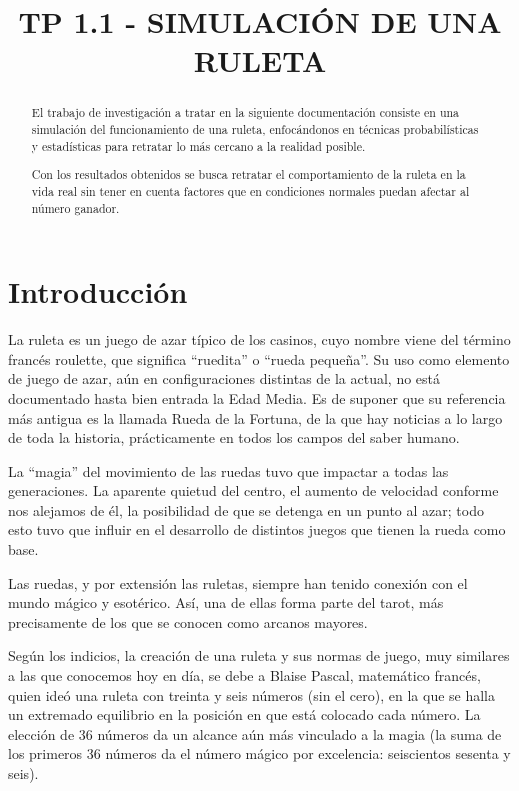 


\title{TP 1.1 - SIMULACIÓN DE UNA RULETA}


\maketitle
\begin{abstract}
  El trabajo de investigación a tratar en la siguiente documentación consiste en una simulación del funcionamiento de una ruleta, enfocándonos en técnicas probabilísticas y estadísticas para retratar lo más cercano a la realidad posible.

  Con los resultados obtenidos se busca retratar el comportamiento de la ruleta en la vida real sin tener en cuenta factores que en condiciones normales puedan afectar al número ganador.
\end{abstract}


\section{Introducción}
La ruleta es un juego de azar típico de los casinos, cuyo nombre viene del término francés roulette, que significa ``ruedita'' o ``rueda pequeña''. Su uso como elemento de juego de azar, aún en configuraciones distintas de la actual, no está documentado hasta bien entrada la Edad Media. Es de suponer que su referencia más antigua es la llamada Rueda de la Fortuna, de la que hay noticias a lo largo de toda la historia, prácticamente en todos los campos del saber humano.

La ``magia'' del movimiento de las ruedas tuvo que impactar a todas las generaciones. La aparente quietud del centro, el aumento de velocidad conforme nos alejamos de él, la posibilidad de que se detenga en un punto al azar; todo esto tuvo que influir en el desarrollo de distintos juegos que tienen la rueda como base.

Las ruedas, y por extensión las ruletas, siempre han tenido conexión con el mundo mágico y esotérico. Así, una de ellas forma parte del tarot, más precisamente de los que se conocen como arcanos mayores.

Según los indicios, la creación de una ruleta y sus normas de juego, muy similares a las que conocemos hoy en día, se debe a Blaise Pascal, matemático francés, quien ideó una ruleta con treinta y seis números (sin el cero), en la que se halla un extremado equilibrio en la posición en que está colocado cada número. La elección de 36 números da un alcance aún más vinculado a la magia (la suma de los primeros 36 números da el número mágico por excelencia: seiscientos sesenta y seis).

